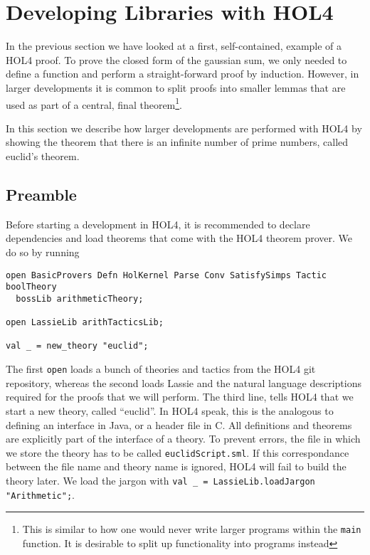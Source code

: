\section{Developing Libraries with HOL4}

In the previous section we have looked at a first, self-contained, example of a
HOL4 proof.
To prove the closed form of the gaussian sum, we only needed to define a function
and perform a straight-forward proof by induction.
However, in larger developments it is common to split proofs into smaller
lemmas that are used as part of a central, final theorem\footnote{This is similar to how one would never write larger programs within the \texttt{main} function. It is desirable to split up functionality into programs instead}.

In this section we describe how larger developments are performed with HOL4 by
showing the theorem that there is an infinite number of prime numbers, called
euclid's theorem.

\subsection{Preamble}
Before starting a development in HOL4, it is recommended to declare dependencies
and load theorems that come with the HOL4 theorem prover.
We do so by running

\begin{lstlisting}
open BasicProvers Defn HolKernel Parse Conv SatisfySimps Tactic  boolTheory
  bossLib arithmeticTheory;

open LassieLib arithTacticsLib;

val _ = new_theory "euclid";
\end{lstlisting}

The first \lstinline{open} loads a bunch of theories and tactics from the HOL4
git repository, whereas the second loads Lassie and the natural language
descriptions required for the proofs that we will perform.
The third line, tells HOL4 that we start a new theory, called ``euclid''.
In HOL4 speak, this is the analogous to defining an interface in Java, or a
header file in C.
All definitions and theorems are explicitly part of the interface of a theory.
To prevent errors, the file in which we store the theory has to be called
\lstinline{euclidScript.sml}.
If this correspondance between the file name and theory name is ignored,
HOL4 will fail to build the theory later.
We load the jargon with \lstinline{val _ = LassieLib.loadJargon "Arithmetic";}.

